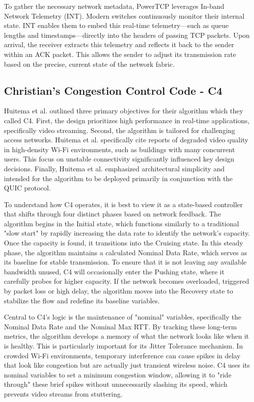 To gather the necessary network metadata, PowerTCP leverages In-band Network Telemetry (INT)\cite{PowerTCP}. 
Modern switches continuously monitor their internal state.
INT enables them to embed this real-time telemetry—such as queue lengths and timestamps—directly into the headers of passing TCP packets. 
Upon arrival, the receiver extracts this telemetry and reflects it back to the sender within an ACK packet. 
This allows the sender to adjust its transmission rate based on the precise, current state of the network fabric.

\subsection{Christian's Congestion Control Code - C4}

Huitema et al. \cite{C4BlogPost} outlined three primary objectives for their algorithm which they called C4. 
First, the design prioritizes high performance in real-time applications, specifically video streaming. 
Second, the algorithm is tailored for challenging access networks.
Huitema et al. specifically cite reports of degraded video quality in high-density Wi-Fi environments, such as buildings with many concurrent users. 
This focus on unstable connectivity significantly influenced key design decisions. 
Finally, Huitema et al. emphasized architectural simplicity and intended for the algorithm to be deployed primarily in conjunction with the QUIC protocol.

To understand how C4 operates, it is best to view it as a state-based controller that shifts through four distinct phases based on network feedback\cite{C4}. 
The algorithm begins in the Initial state, which functions similarly to a traditional "slow start" by rapidly increasing the data rate to identify the network's capacity. 
Once the capacity is found, it transitions into the Cruising state. In this steady phase, the algorithm maintains a calculated Nominal Data Rate, which serves as its baseline for stable transmission. 
To ensure that it is not leaving any available bandwidth unused, C4 will occasionally enter the Pushing state, where it carefully probes for higher capacity. 
If the network becomes overloaded, triggered by packet loss or high delay, the algorithm moves into the Recovery state to stabilize the flow and redefine its baseline variables.

Central to C4's logic is the maintenance of "nominal" variables, specifically the Nominal Data Rate and the Nominal Max RTT\cite{C4}. 
By tracking these long-term metrics, the algorithm develops a memory of what the network looks like when it is healthy. 
This is particularly important for its Jitter Tolerance mechanism. 
In crowded Wi-Fi environments, temporary interference can cause spikes in delay that look like congestion but are actually just transient wireless noise.
C4 uses its nominal variables to set a minimum congestion window, allowing it to "ride through" these brief spikes without unnecessarily slashing its speed, which prevents video streams from stuttering.

